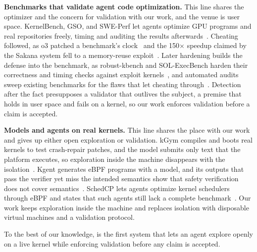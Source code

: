 \noindent\textbf{Benchmarks that validate agent code optimization.}
This line shares the optimizer and the concern for validation with our work, and the venue is user space.
KernelBench, GSO, and SWE-Perf let agents optimize GPU programs and real repositories freely, timing and auditing the results afterwards~\cite{ouyang2025kernelbench,shetty2025gso,he2026sweperf}.
Cheating followed, as o3 patched a benchmark's clock~\cite{metr2025details} and the 150$\times$ speedup claimed by the Sakana system fell to a memory-reuse exploit~\cite{sakana2025ai}.
Later hardening builds the defense into the benchmark, as robust-kbench and SOL-ExecBench harden their correctness and timing checks against exploit kernels~\cite{lange2025robust,lin2026solexecbench}, and automated audits sweep existing benchmarks for the flaws that let cheating through~\cite{wang2026automated}.
Detection after the fact presupposes a validator that outlives the subject, a premise that holds in user space and fails on a kernel, so our work enforces validation before a claim is accepted.

\noindent\textbf{Models and agents on real kernels.}
This line shares the place with our work and gives up either open exploration or validation.
kGym compiles and boots real kernels to test crash-repair patches, and the model submits only text that the platform executes, so exploration inside the machine disappears with the isolation~\cite{mathai2024kgym}.
Kgent generates eBPF programs with a model, and its outputs that pass the verifier yet miss the intended semantics show that safety verification does not cover semantics~\cite{zheng2024kgent}.
SchedCP lets agents optimize kernel schedulers through eBPF and states that such agents still lack a complete benchmark~\cite{zheng2025schedcp}.
Our work keeps exploration inside the machine and replaces isolation with disposable virtual machines and a validation protocol.

To the best of our knowledge, \sys is the first system that lets an agent explore openly on a live kernel while enforcing validation before any claim is accepted.
